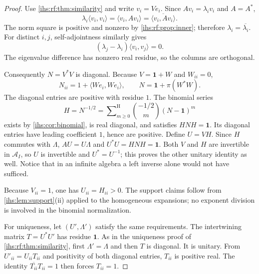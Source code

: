 \documentclass[11pt,a4paper]{article}
\numberwithin{equation}{section}
\theoremstyle{definition}
\theoremstyle{remark}
\newcommand{\Arf}{\mathcal A_I}
\newcommand{\Id}{\mathbf 1}
\newcommand{\sH}{\mathop{\sum}\nolimits^{\mathrm H}}
\newcommand{\ip}[2]{\langle#1,#2\rangle}
\begin{document}
\begin{proof}
Use \cref{ihs:rf:thm:similarity} and write $v_i=Ve_i$. Since
$Av_i=\lambda_i v_i$ and $A=A^*$,
\[
 \lambda_i\ip{v_i}{v_i}=\ip{v_i}{Av_i}=\overline{\ip{v_i}{Av_i}}.
\]
The norm square is positive and nonzero by \cref{ihs:rf:prop:inner};
therefore $\lambda_i=\overline{\lambda_i}$. For distinct $i,j$,
self-adjointness similarly gives
\[
 (\lambda_j-\lambda_i)\ip{v_i}{v_j}=0.
\]
The eigenvalue difference has nonzero real residue, so the columns are
orthogonal.

Consequently $N=V^*V$ is diagonal. Because $V=\Id+W$ and $W_{ii}=0$,
\begin{equation}\label{ihs:rf:eq:normalization}
 N_{ii}=1+\ip{We_i}{We_i},\qquad N=\Id+\pi(W^*W).
\end{equation}
The diagonal entries are positive with residue $1$. The binomial series
\[
 H=N^{-1/2}=\sH_{m\ge0}\binom{-1/2}{m}(N-\Id)^m
\]
exists by \cref{ihs:cor:binomial}, is real diagonal, and satisfies
$HNH=\Id$. Its diagonal entries have leading coefficient $1$, hence are
positive. Define $U=VH$. Since $H$ commutes with $\Lambda$, $AU=U\Lambda$
and $U^*U=HNH=\Id$. Both $V$ and $H$ are invertible in $\Arf$, so $U$ is
invertible and $U^*=U^{-1}$; this proves the other unitary identity as well.
Notice that in an infinite algebra a left inverse alone would not have
sufficed.

Because $V_{ii}=1$, one has $U_{ii}=H_{ii}>0$. The support claims follow
from \cref{ihs:lem:support}(ii) applied to the homogeneous expansions; no
exponent division is involved in the binomial normalization.

For uniqueness, let $(U',\Lambda')$ satisfy the same requirements. The
intertwining matrix $T=U^*U'$ has residue $\Id$. As in the uniqueness proof
of \cref{ihs:rf:thm:similarity}, first $\Lambda'=\Lambda$ and then $T$ is
diagonal. It is unitary. From $U'_{ii}=U_{ii}T_{ii}$ and positivity of both
diagonal entries, $T_{ii}$ is positive real. The identity
$\overline{T_{ii}}T_{ii}=1$ then forces $T_{ii}=1$.
\end{proof}
\end{document}
